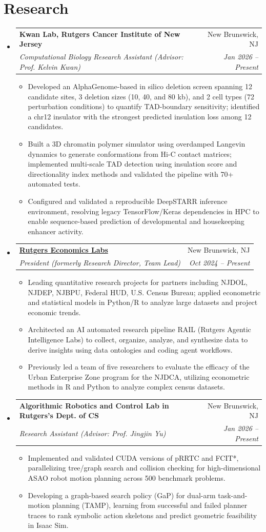 \documentclass[letterpaper,11pt]{article}
\makeatletter
\newcommand{\resumeItem}[1]{
  \item\small{
    {#1 \vspace{-2pt}}
  }
}
\newcommand{\resumeSubheading}[4]{
  \vspace{-2pt}\item
    \begin{tabular*}{0.97\textwidth}[t]{l@{\extracolsep{\fill}}r}
      \textbf{#1} & #2 \\
      \textit{\small#3} & \textit{\small #4} \\
    \end{tabular*}\vspace{-7pt}
}
\newcommand{\resumeSubHeadingListStart}{\begin{itemize}[leftmargin=0.15in, label={}]}
\newcommand{\resumeSubHeadingListEnd}{\end{itemize}}
\newcommand{\resumeItemListStart}{\begin{itemize}}
\newcommand{\resumeItemListEnd}{\end{itemize}\vspace{-5pt}}
\makeatother
\begin{document}
\section{Research}
  \resumeSubHeadingListStart
    \resumeSubheading
        {Kwan Lab, Rutgers Cancer Institute of New Jersey}{New Brunswick, NJ}
        {Computational Biology Research Assistant (Advisor: Prof. Kelvin Kwan)}{Jan 2026 -- Present}
        \resumeItemListStart
            \resumeItem{Developed an AlphaGenome-based in silico deletion screen spanning 12 candidate sites, 3 deletion sizes (10, 40, and 80 kb), and 2 cell types (72 perturbation conditions) to quantify TAD-boundary sensitivity; identified a chr12 insulator with the strongest predicted insulation loss among 12 candidates.}
            \resumeItem{Built a 3D chromatin polymer simulator using overdamped Langevin dynamics to generate conformations from Hi-C contact matrices; implemented multi-scale TAD detection using insulation score and directionality index methods and validated the pipeline with 70+ automated tests.}
            \resumeItem{Configured and validated a reproducible DeepSTARR inference environment, resolving legacy TensorFlow/Keras dependencies in HPC to enable sequence-based prediction of developmental and housekeeping enhancer activity.}
    \resumeItemListEnd
  \resumeSubheading
      {\href{https://rutgerseconomics.org}{Rutgers Economics Labs}}{New Brunswick, NJ}
      {President (formerly Research Director, Team Lead)}{Oct 2024 -- Present}
      \resumeItemListStart
        \resumeItem{Leading quantitative research projects for partners including NJDOL, NJDEP, NJBPU, Federal HUD, U.S. Census Bureau; applied econometric and statistical models in Python/R to analyze large datasets and project economic trends.}
        \resumeItem{Architected an AI automated research pipeline RAIL (Rutgers Agentic Intelligence Labs) to collect, organize, analyze, and synthesize data to derive insights using data ontologies and coding agent workflows.}
        \resumeItem{Previously led a team of five researchers to evaluate the efficacy of the Urban Enterprise Zone program for the NJDCA, utilizing econometric methods in R and Python to analyze complex census datasets.}
      \resumeItemListEnd
    \resumeSubheading
      {Algorithmic Robotics and Control Lab in Rutgers's Dept. of CS}{New Brunswick, NJ}
      {Research Assistant (Advisor: Prof. Jingjin Yu)}{Jan 2026 -- Present}
      \resumeItemListStart
        \resumeItem{Implemented and validated CUDA versions of pRRTC and FCIT*, parallelizing tree/graph search and collision checking for high-dimensional ASAO robot motion planning across 500 benchmark problems.}
        \resumeItem{Developing a graph-based search policy (GaP) for dual-arm task-and-motion planning (TAMP), learning from successful and failed planner traces to rank symbolic action skeletons and predict geometric feasibility in Isaac Sim.}
      \resumeItemListEnd
  \resumeSubHeadingListEnd
\end{document}
